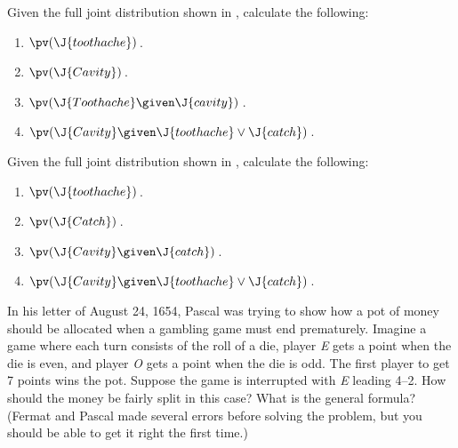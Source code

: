 
\begin{uexercise}
Given the full joint distribution shown in ,
calculate the following:
\begin{enumerate}
\item \(\pv(\J{toothache})\)\,.
\item \(\pv(\J{Cavity})\)\,.
\item \(\pv(\J{Toothache}\given\J{cavity})\)\,.
\item \(\pv(\J{Cavity}\given\J{toothache}\lor \J{catch})\)\,.
\end{enumerate}
\end{uexercise} 

\begin{iexercise}
Given the full joint distribution shown in ,
calculate the following:
\begin{enumerate}
\item \(\pv(\J{toothache})\)\,.
\item \(\pv(\J{Catch})\)\,.
\item \(\pv(\J{Cavity}\given\J{catch})\)\,.
\item \(\pv(\J{Cavity}\given\J{toothache}\lor \J{catch})\)\,.
\end{enumerate}
\end{iexercise} 



\begin{exercise}
In his letter of August 24, 1654, Pascal was trying to show how a
pot of money should be allocated when a gambling game must end
prematurely. Imagine a game where each turn consists of the roll of a
die, player {\em E} gets a point when the die is even, and player {\em
  O} gets a point when the die is odd.  The first player to get 7
points wins the pot.  Suppose the game is interrupted with {\em E}
leading 4--2.  How should the money be fairly split in this case?
What is the general formula? (Fermat and Pascal made several errors before solving
the problem, but you should be able to get it right the first time.)
\end{exercise} 

